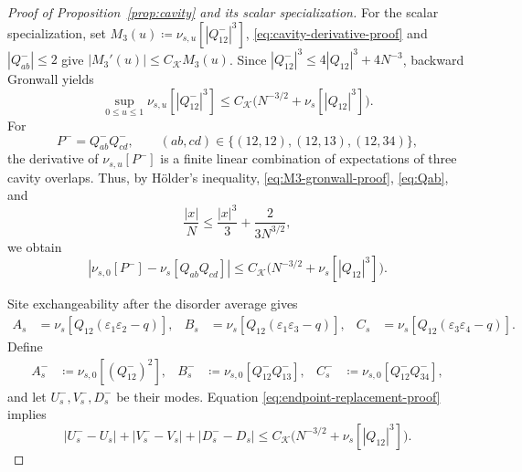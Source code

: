 \documentclass[11pt]{article}
\numberwithin{equation}{section}
\newcommand{\1}{\mathbf 1}
\newcommand{\cK}{\mathcal K}
\begin{document}
\begin{proof}[Proof of Proposition~\ref{prop:cavity} and its scalar specialization]
For the scalar specialization, set
$M_3(u)\coloneqq\nu_{s,u}[|Q^-_{12}|^3]$,
\eqref{eq:cavity-derivative-proof} and $|Q^-_{ab}|\le2$ give
$|M_3'(u)|\le C_{\cK}M_3(u)$.  Since
$|Q^-_{12}|^3\le4|Q_{12}|^3+4N^{-3}$, backward Gronwall yields
\begin{equation}
 \sup_{0\le u\le1}\nu_{s,u}[|Q^-_{12}|^3]
 \le C_{\cK}\bigl(N^{-3/2}+\nu_s[|Q_{12}|^3]\bigr).
 \label{eq:M3-gronwall-proof}
\end{equation}
For
\[
 P^-=Q^-_{ab}Q^-_{cd},\qquad
 (ab,cd)\in\{(12,12),(12,13),(12,34)\},
\]
the derivative of $\nu_{s,u}[P^-]$ is a finite linear combination of
expectations of three cavity overlaps.  Thus, by H\"older's inequality,
\eqref{eq:M3-gronwall-proof}, \eqref{eq:Qab}, and
\[
 \frac{|x|}{N}\le\frac{|x|^3}{3}+\frac{2}{3N^{3/2}},
\]
we obtain
\begin{equation}
 \left|\nu_{s,0}[P^-]-\nu_s[Q_{ab}Q_{cd}]\right|
 \le C_{\cK}\bigl(N^{-3/2}+\nu_s[|Q_{12}|^3]\bigr).
 \label{eq:endpoint-replacement-proof}
\end{equation}

Site exchangeability
after the disorder average gives
\[
 \begin{aligned}
 A_s&=\nu_s[Q_{12}(\varepsilon_1\varepsilon_2-q)],&
 B_s&=\nu_s[Q_{12}(\varepsilon_1\varepsilon_3-q)],&
 C_s&=\nu_s[Q_{12}(\varepsilon_3\varepsilon_4-q)].
 \end{aligned}
\]
Define
\[
 \begin{aligned}
 A_s^-&\coloneqq\nu_{s,0}[(Q^-_{12})^2],&
 B_s^-&\coloneqq\nu_{s,0}[Q^-_{12}Q^-_{13}],&
 C_s^-&\coloneqq\nu_{s,0}[Q^-_{12}Q^-_{34}],
 \end{aligned}
\]
and let $U_s^-,V_s^-,D_s^-$ be their modes.  Equation
\eqref{eq:endpoint-replacement-proof} implies
\begin{equation}
 |U_s^--U_s|+|V_s^--V_s|+|D_s^--D_s|
 \le C_{\cK}\bigl(N^{-3/2}+\nu_s[|Q_{12}|^3]\bigr).
 \label{eq:cavity-mode-replacement}
\end{equation}


\end{proof}
\end{document}
